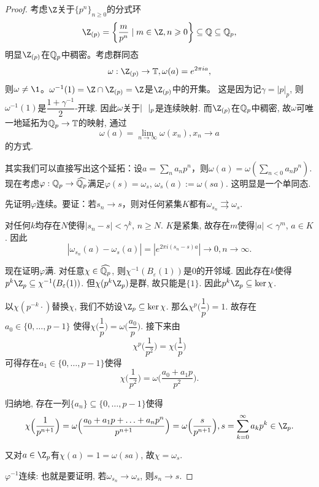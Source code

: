 \begin{proof}
    考虑$\Z$关于$\{p^n\}_{n \geqslant 0}$的分式环
    \[\Z_{(p)} = \bigg\{\frac{m}{p^n} \mid m \in \Z, n \geqslant 0\bigg\} \subseteq \Q \subseteq \Q_p,\]
    明显$\Z_{(p)}$在$\mathbb{Q}_p$中稠密。考虑群同态\[\omega:\Z_{(p)} \to \T,\omega(a) = e^{2\pi i a},\]
    则$\omega \neq \1$。$\omega^{-1}(1) = \Z \cap \Z_{(p)} = \Z$是$\Z_{(p)}$中的开集。
    这是因为记$\gamma = |p|_p$, 则$\omega^{-1}(1)$是$\dfrac{1+\gamma^{-1}}{2}$-开球. 
    因此$\omega$关于$|\ \ |_p$是连续映射. 而$\Z_{(p)}$在$\mathbb{Q}_p$中稠密, 
    故$\omega$可唯一地延拓为$\mathbb{Q}_p \to \mathbb{T}$的映射, 通过
    \[\omega(a) = \lim_{n \to \infty} \omega(x_n),x_n \to a\]的方式.
    
    其实我们可以直接写出这个延拓：设$a = \sum_n a_np^n$，则$\omega(a) = \omega(\sum_{n < 0}a_np^n)$. 现在考虑$\varphi:\mathbb{Q}_p \to \widehat{\mathbb{Q}_p}$满足$\varphi(s) = \omega_s$, $\omega_s(a):=\omega(sa)$. 这明显是一个单同态.

    先证明$\varphi$连续。要证：若$s_n \to s$，则对任何紧集$K$都有$\omega_{s_n} \rightrightarrows \omega_s$.

    对任何$k$均存在$N$使得$|s_n-s| < \gamma^k$, $n \geqslant N$. $K$是紧集, 故存在$m$使得$|a| < \gamma^m$, $a \in K$. 因此
    \[|\omega_{s_n}(a) - \omega_{s}(a)| = |e^{2\pi i (s_n-s)a}| \to 0, n \to \infty.\]

    现在证明$\varphi$满. 对任意$\chi \in \widehat{\mathbb{Q}_p}$, 则$\chi^{-1}(B_\varepsilon(1))$是$0$的开邻域. 因此存在$k$使得$p^k\Z_p \subseteq \chi^{-1}(B_\varepsilon(1))$. 但$\chi(p^k\Z_p)$是群, 故只能是$\{1\}$. 因此$p^k\Z_p \subseteq \ker \chi$.

    以$\chi(p^{-k}\cdot)$替换$\chi$, 我们不妨设$\Z_p \subseteq \ker \chi$. 
    那么$\chi^p\Big(\dfrac{1}{p}\Big) = 1$. 故存在$a_0\in \{0,\ldots,p-1\}$
    使得$\chi\Big(\dfrac{1}{p}\Big) = \omega\Big(\dfrac{a_0}{p}\Big)$. 接下来由
    \[\chi^p\Big(\frac{1}{p^2}\Big) = \chi\Big(\frac{1}{p}\Big)\]
    可得存在$a_1 \in \{0,\ldots,p-1\}$使得
    \[\chi\Big(\frac{1}{p^2}\Big) = \omega\Big(\frac{a_0+a_1p}{p^2}\Big).\]
    
    归纳地, 存在一列$\{a_n\} \subseteq \{0,\ldots,p-1\}$使得
    \[\chi\Big(\frac{1}{p^{n+1}}\Big) 
    = \omega\Big(\frac{a_0+a_1p+\ldots+a_np^n}{p^{n+1}}\Big) 
    = \omega\Big(\frac{s}{p^{n+1}}\Big), s = \sum_{k=0}^\infty a_kp^k\in \Z_p.\]

    又对$a \in \Z_p$有$\chi(a) = 1 = \omega(sa)$, 故$\chi = \omega_s$.

    $\varphi^{-1}$连续: 也就是要证明, 若$\omega_{s_n} \to \omega_s$, 则$s_n \to s$.


\end{proof}
